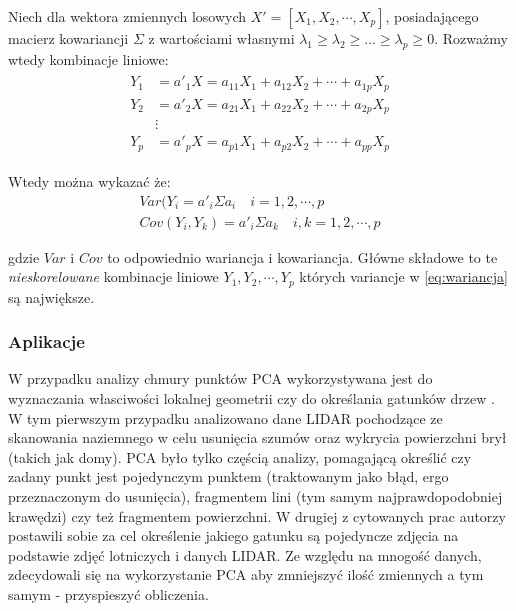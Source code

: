 Niech dla wektora zmiennych losowych $X'=[X_{1}, X_{2}, \cdots, X_{p}]$, posiadającego macierz kowariancji $\Sigma$ z wartościami własnymi $\lambda_{1} \geqslant \lambda_{2} \geqslant ... \geqslant \lambda_{p}
\geqslant 0$. Rozważmy wtedy kombinacje liniowe:
\begin{align}
    \begin{split}
        Y_{1} &= a'_{1}X = a_{11}X_{1} + a_{12}X_{2} + \cdots + a_{1p}X_{p} \\
        Y_{2} &= a'_{2}X = a_{21}X_{1} + a_{22}X_{2} + \cdots + a_{2p}X_{p} \\
        &\vdots \\
        Y_{p} &= a'_{p}X = a_{p1}X_{1} + a_{p2}X_{2} + \cdots + a_{pp}X_{p}
    \end{split}
\end{align}

Wtedy można wykazać że:
\begin{align}
    Var(Y_{i} = a'_{i}\Sigma a_{i} \quad i = 1,2, \cdots, p 
    \label{eq:wariancja} \\
    Cov(Y_{i}, Y_{k}) = a'_{i} \Sigma a_{k} \quad i,k = 1,2, \cdots, p
\end{align}

gdzie $Var$ i $Cov$ to odpowiednio wariancja i kowariancja. Główne składowe to te \textit{nieskorelowane} kombinacje liniowe $Y_{1}, Y_{2}, \cdots, Y_{p}$ których variancje w \ref{eq:wariancja} są
największe.

\subsubsection{Aplikacje}
W przypadku analizy chmury punktów PCA wykorzystywana jest do wyznaczania własciwości lokalnej geometrii \cite{natale2010} czy do określania gatunków drzew \cite{lee2016}.
W tym pierwszym przypadku analizowano dane LIDAR pochodzące ze skanowania naziemnego w celu usunięcia szumów oraz wykrycia powierzchni brył (takich jak domy).
PCA było tylko częścią analizy, pomagającą określić czy zadany punkt jest pojedynczym punktem (traktowanym jako błąd, ergo przeznaczonym do usunięcia), fragmentem lini (tym samym najprawdopodobniej krawędzi)
czy też fragmentem powierzchni.
W drugiej z cytowanych prac autorzy postawili sobie za cel określenie jakiego gatunku są pojedyncze zdjęcia na podstawie zdjęć lotniczych i danych LIDAR.
Ze względu na mnogość danych, zdecydowali się na wykorzystanie PCA aby zmniejszyć ilość zmiennych a tym samym - przyspieszyć obliczenia.

